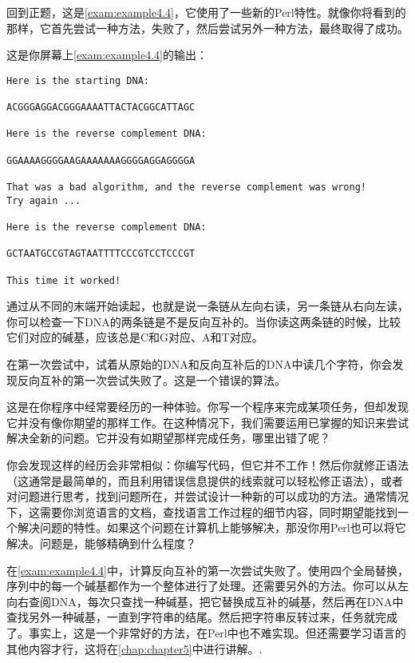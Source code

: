回到正题，这是\autoref{exam:example4.4}，它使用了一些新的Perl特性。就像你将看到的那样，它首先尝试一种方法，失败了，然后尝试另外一种方法，最终取得了成功。



这是你屏幕上\autoref{exam:example4.4}的输出：

\begin{lstlisting}
Here is the starting DNA:

ACGGGAGGACGGGAAAATTACTACGGCATTAGC

Here is the reverse complement DNA:

GGAAAAGGGGAAGAAAAAAAGGGGAGGAGGGGA

That was a bad algorithm, and the reverse complement was wrong!
Try again ...

Here is the reverse complement DNA:

GCTAATGCCGTAGTAATTTTCCCGTCCTCCCGT

This time it worked!
\end{lstlisting}

通过从不同的末端开始读起，也就是说一条链从左向右读，另一条链从右向左读，你可以检查一下DNA的两条链是不是反向互补的。当你读这两条链的时候，比较它们对应的碱基，应该总是C和G对应、A和T对应。

在第一次尝试中，试着从原始的DNA和反向互补后的DNA中读几个字符，你会发现反向互补的第一次尝试失败了。这是一个错误的算法。

这是在你程序中经常要经历的一种体验。你写一个程序来完成某项任务，但却发现它并没有像你期望的那样工作。在这种情况下，我们需要运用已掌握的知识来尝试解决全新的问题。它并没有如期望那样完成任务，哪里出错了呢？

你会发现这样的经历会非常相似：你编写代码，但它并不工作！然后你就修正语法（这通常是最简单的，而且利用错误信息提供的线索就可以轻松修正语法），或者对问题进行思考，找到问题所在，并尝试设计一种新的可以成功的方法。通常情况下，这需要你浏览语言的文档，查找语言工作过程的细节内容，同时期望能找到一个解决问题的特性。如果这个问题在计算机上能够解决，那没你用Perl也可以将它解决。问题是，能够精确到什么程度？

在\autoref{exam:example4.4}中，计算反向互补的第一次尝试失败了。使用四个全局替换，序列中的每一个碱基都作为一个整体进行了处理。还需要另外的方法。你可以从左向右查阅DNA，每次只查找一种碱基，把它替换成互补的碱基，然后再在DNA中查找另外一种碱基，一直到字符串的结尾。然后把字符串反转过来，任务就完成了。事实上，这是一个非常好的方法，在Perl中也不难实现。但还需要学习语言的其他内容才行，这将在\autoref{chap:chapter5}中进行讲解。.

